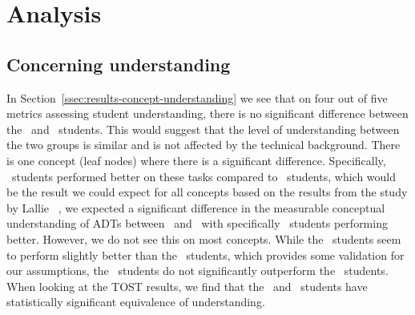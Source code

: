 \section{Analysis}\label{sec:analysis}

\subsection{Concerning understanding}
\label{ssec:analysis-concerning-understanding}

In Section~\ref{ssec:results-concept-understanding} we see that on four out of five metrics assessing student understanding, there is no significant difference between the \ICS\ and \SEC\ students. This would suggest that the level of understanding between the two groups is similar and is not affected by the technical background. There is one concept (leaf nodes) where there is a significant difference. Specifically, \SEC\ students performed better on these tasks compared to \ICS\ students, which would be the result we could expect for all concepts based on the results from the
study by Lallie \etal~\cite{lallieEmpiricalEvaluationEffectiveness2017}, we expected a significant difference in the measurable conceptual understanding of ADTs between \ICS\ and \SEC\, with specifically \SEC\ students performing better. However, we do not see this on most concepts. While the \SEC\ students seem to perform slightly better than the \ICS\ students, which provides some validation for our assumptions, the \SEC\ students do not significantly outperform the \ICS\ students. When looking at the TOST results, we find that the \SEC\ and \ICS\ students have statistically significant equivalence of understanding.

